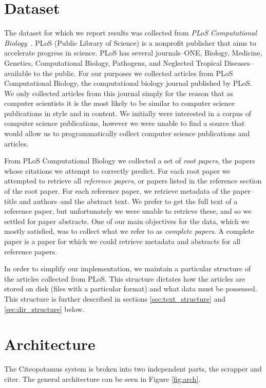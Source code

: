 \documentclass[10pt, conference, compsocconf]{IEEEtran}
\begin{document}
\section{Dataset}\label{sec:dataset}
The dataset for which we report results was collected from \textit{PLoS
Computational Biology}~\cite{plos}. PLoS (Public Library of Science) is a
nonprofit publisher that aims to accelerate progress in science. PLoS has
several journals--ONE, Biology, Medicine, Genetics, Computational Biology,
Pathogens, and Neglected Tropical Diseases--available to the public. For our
purposes we collected articles from PLoS Computational Biology, the
computational biology journal published by PLoS. We only collected articles
from this journal simply for the reason that as computer scientists it is the
most likely to be similar to computer science publications in style and in
content. We initially were interested in a corpus of computer science
publications, however we were unable to find a source that would allow us to
programmatically collect computer science publications and articles.

From PLoS Computational Biology we collected a set of \textit{root papers}, the
papers whose citations we attempt to correctly predict. For each root paper we
attempted to retrieve all \textit{reference papers}, or papers listed in the
reference section of the root paper. For each reference paper, we retrieve
metadata of the paper--title and authors--and the abstract text. We prefer to
get the full text of a reference paper, but unfortunately we were unable to
retrieve these, and so we settled for paper abstracts. One of our main
objectives for the data, which we mostly satisfied, was to collect what we
refer to as \textit{complete papers}. A complete paper is a paper for which we
could retrieve metadata and abstracts for all reference papers.

In order to simplify our implementation, we maintain a particular structure of
the articles collected from PLoS. This structure dictates how the articles are
stored on disk (files with a particular format) and what data must be
possessed. This structure is further described in sections
\ref{sec:text_structure} and \ref{sec:dir_structure} below.

\section{Architecture}\label{sec:architecture}
The Citeopotamus system is broken into two independent parts, the scrapper and citer.
The general architecture can be seen in Figure \ref{fig:arch}.
\end{document}
